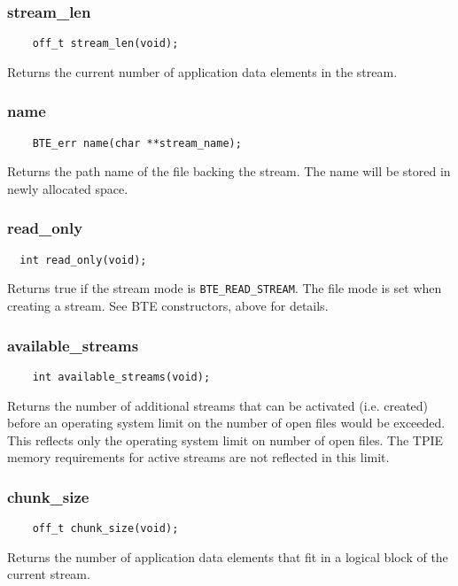 \subsubsection{stream\_len}
\begin{lstlisting}
    off_t stream_len(void);
\end{lstlisting}
Returns the current number of application data elements in the stream.


\subsubsection{name}
\begin{lstlisting}
    BTE_err name(char **stream_name);
\end{lstlisting}
Returns the path name of the file backing the stream. The name will be
stored in newly allocated space.

\subsubsection{read\_only}
\begin{lstlisting}
  int read_only(void);
\end{lstlisting}
Returns true if the stream mode is \lstinline|BTE_READ_STREAM|. The
file mode is set when creating a stream. See BTE constructors, above
for details.

\subsubsection{available\_streams}
\begin{lstlisting}
    int available_streams(void);    
\end{lstlisting}
Returns the number of additional streams that can be activated (i.e.
created) before an operating system limit on the number of open files
would be exceeded. This reflects only the operating system limit on
number of open files. The TPIE memory requirements for active streams
are not reflected in this limit.

\subsubsection{chunk\_size}
\begin{lstlisting}
    off_t chunk_size(void);
\end{lstlisting}
Returns the number of application data elements that fit in
a logical block of the current stream.

